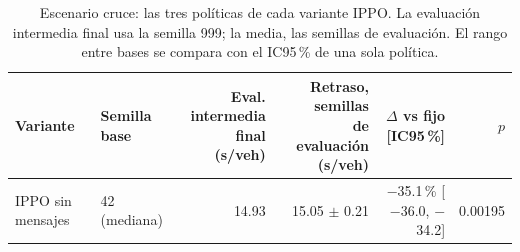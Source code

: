 \begin{table}[H]
\centering
\scriptsize
\setlength{\tabcolsep}{3pt}
\begin{tabular}{llrrrr}
\toprule
Variante & Semilla base & \makecell{Eval. intermedia\\final (s/veh)} & \makecell{Retraso, semillas\\de evaluación (s/veh)} & $\Delta$ vs fijo [IC95\,\%] & $p$ \\
\midrule
IPPO sin mensajes & 42 (mediana) & 14.93 & 15.05 $\pm$ 0.21 & $-$35.1\,\% [$-$36.0, $-$34.2] & 0.00195 \\
\bottomrule
\end{tabular}
\caption[Escenario cruce: fragilidad del entrenamiento IPPO]{Escenario cruce: las tres políticas de cada variante IPPO. La evaluación intermedia final usa la semilla 999; la media, las semillas de evaluación. El rango entre bases se compara con el IC95\,\% de una sola política.}
\label{tab:cruce-fragilidad}
\end{table}
